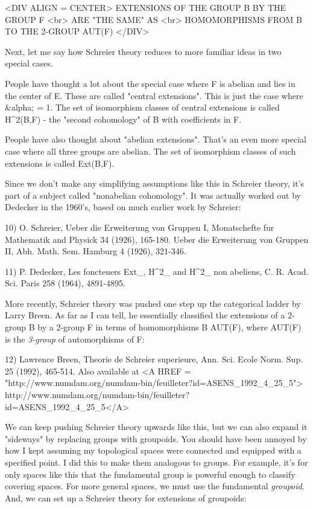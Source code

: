<DIV ALIGN = CENTER>
                EXTENSIONS OF THE GROUP B BY THE GROUP F <br>
                            ARE "THE SAME" AS <br>
               HOMOMORPHISMS FROM B TO THE 2-GROUP AUT(F)
</DIV>

Next, let me say how Schreier theory reduces to more familiar ideas in two 
special cases.

People have thought a lot about the special case where F is abelian and 
lies in the center of E.  These are called "central extensions".  
This is just the case where &alpha; = 1.  The set 
of isomorphism classes of central extensions is called H^{2}(B,F) - 
the "second cohomology" of B with coefficients in F.

People have also thought about "abelian extensions".  
That's an even more special case where all three groups are abelian.  
The set of isomorphism classes of such extensions is called Ext(B,F).  

Since we don't make any simplifying assumptions like this in Schreier 
theory, it's part of a subject called "nonabelian cohomology".  
It was 
actually worked out by Dedecker in the 1960's, based on much earlier 
work by Schreier:

10) O. Schreier, Ueber die Erweiterung von Gruppen I, Monatschefte fur
Mathematik and Physick 34 (1926), 165-180.  Ueber die Erweiterung von 
Gruppen II, Abh. Math. Sem. Hamburg 4 (1926), 321-346.

11) P. Dedecker, Les foncteuers Ext_{\Pi }, 
H^{2}_{\Pi } and 
H^{2}_{\Pi } 
non abeliens,
C. R. Acad. Sci. Paris 258 (1964), 4891-4895.

More recently, Schreier theory was pushed one step up the categorical 
ladder by Larry Breen.  As far as I can tell, he essentially classified 
the extensions of a 2-group B by a 2-group F in terms of homomorphisms 
B \to  AUT(F), where AUT(F) is the \emph{3-group} of automorphisms of F:

12) Lawrence Breen, Theorie de Schreier superieure, Ann. Sci. Ecole Norm. 
Sup. 25 (1992), 465-514.  Also available at
<A HREF = "http://www.numdam.org/numdam-bin/feuilleter?id=ASENS_1992_4_25_5">
http://www.numdam.org/numdam-bin/feuilleter?id=ASENS_1992_4_25_5</A>

We can keep pushing Schreier theory upwards like this, but we can also 
expand it "sideways" by replacing groups with groupoids.  
You should have 
been annoyed by how I kept assuming my topological spaces were connected 
and equipped with a specified point.   I did this to make them analogous 
to groups.  For example, it's for only spaces like this that the fundamental 
group is powerful enough to classify covering spaces.  For more general
spaces, we must use the fundamental \emph{groupoid}. 
And, we can set up a Schreier theory for extensions of groupoids:

